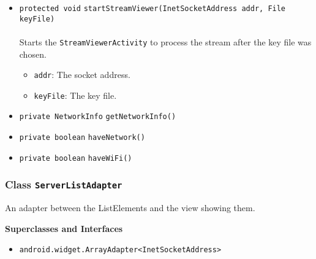 \begin{itemize}
\item \lstinline|protected void| \lstinline|startStreamViewer|\lstinline|(InetSocketAddress addr, File keyFile)|\\ \\[-0.6em]
Starts the \lstinline|StreamViewerActivity| to process the stream after
 the key file was chosen.
\begin{itemize}
\item \lstinline|addr|: The socket address.
\item \lstinline|keyFile|: The key file.
\end{itemize}



\item \lstinline|private NetworkInfo| \lstinline|getNetworkInfo|\lstinline|()| \\[-0.6em]




\item \lstinline|private boolean| \lstinline|haveNetwork|\lstinline|()| \\[-0.6em]




\item \lstinline|private boolean| \lstinline|haveWiFi|\lstinline|()| \\[-0.6em]




\end{itemize}

\subsubsection{Class \lstinline|ServerListAdapter|}
An adapter between the ListElements and the view showing them. \\
\noindent\begin{minipage}[t]{5cm}
\vspace{0.3em}
\hspace*{2em}
\vspace{0.3em}
\end{minipage}



\textbf{\sffamily Superclasses and Interfaces}
\begin{itemize}
\item \lstinline|android.widget.ArrayAdapter<InetSocketAddress>|
\end{itemize}


